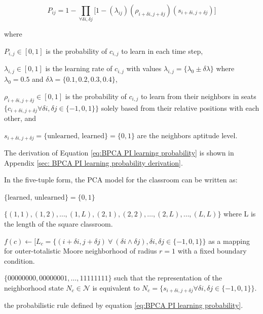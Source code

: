 \begin{equation}
    \label{eq:BPCA PI learning probability}
        P_{ij} = 1 - \prod_{\forall \delta i, \delta j}{\lbrack1-(\lambda_{ij})(\rho_{i+\delta i, j+\delta j})(s_{i+\delta i, j+\delta j})}\rbrack
\end{equation}

where

$P_{i,j} \in [0,1]$ is the probability of $c_{i,j}$ to learn in each time step, 

$\lambda_{i,j} \in [0,1]$ is the learning rate of $c_{i,j}$ with values $\lambda_{i,j} = \lbrace \lambda_0 \pm \delta \lambda \rbrace$ where $\lambda_0 = 0.5$ and $\delta \lambda = \lbrace 0.1, 0.2, 0.3, 0.4 \rbrace$, 

$\rho_{i+\delta i, j+\delta j} \in [0,1]$ is the probability of $c_{i,j}$ to learn from their neighbors in seats $\lbrace c_{i+\delta i, j+\delta j} \forall \delta i, \delta j \in \lbrace -1,0,1 \rbrace \rbrace$ solely based from their relative positions with each other, and

$s_{i+\delta i, j+\delta j} = \lbrace\text{unlearned, learned}\rbrace=\lbrace 0,1 \rbrace$ are the neighbors aptitude level.

The derivation of Equation \ref{eq:BPCA PI learning probability} is shown in Appendix \ref{sec: BPCA PI learning probability derivation}.

In the five-tuple form, the PCA model for the classroom can be written as:

\begin{CAdef}
\itemS $\lbrace \text{learned, unlearned} \rbrace = \lbrace 0, 1 \rbrace$

\itemC $\lbrace (1,1), (1,2), \dots, (1,L), (2, 1), (2,2), \dots, (2,L), \dots, (L,L)\rbrace$ where L is the length of the square classroom.

\itemL $f(c) \leftarrow \lbrack L_c = \lbrace (i+\delta i,j+\delta j) ~\forall~ (\delta i \land \delta j),  \delta i, \delta j \in \lbrace -1,0,1 \rbrace \rbrace $ as a mapping for outer-totalistic Moore neighborhood of radius $r=1$ with a fixed boundary condition.

\itemN $\lbrace 00000000, 00000001, \dots, 11111111 \rbrace$ such that the representation of the neighborhood state $N_c \in \mathcal{N}$ is equivalent to $N_c = \lbrace s_{i+\delta i, j+\delta j} \forall \delta i, \delta j \in \lbrace -1,0,1 \rbrace \rbrace$.

\itemR the probabilistic rule defined by equation \ref{eq:BPCA PI learning probability}.
\end{CAdef}

